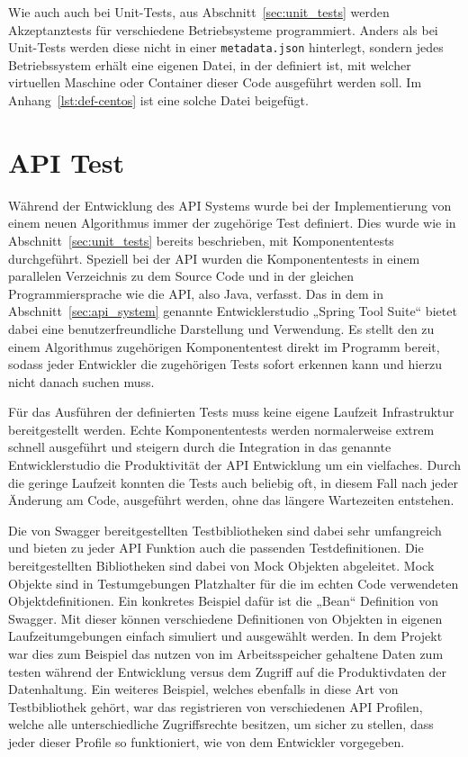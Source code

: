 {Wie auch auch bei Unit\hyp{}Tests, aus Abschnitt~\ref{sec:unit_tests} werden
Akzeptanztests für verschiedene Betriebsysteme programmiert. Anders als bei
Unit\hyp{}Tests werden diese nicht in einer \texttt{metadata.json} hinterlegt,
sondern jedes Betriebssystem erhält eine eigenen Datei, in der definiert ist,
mit welcher virtuellen Maschine oder Container dieser Code ausgeführt werden
soll. Im Anhang~\ref{lst:def-centos} ist eine solche Datei beigefügt.
\mr%

\section{API Test}
\label{sec:api_test}
Während der Entwicklung des API Systems wurde bei der Implementierung von einem
neuen Algorithmus immer der zugehörige Test definiert. Dies wurde wie in
Abschnitt~\ref{sec:unit_tests} bereits beschrieben, mit Komponententests
durchgeführt. Speziell bei der API wurden die Komponententests in einem
parallelen Verzeichnis zu dem Source Code und in der gleichen
Programmiersprache wie die API, also Java, verfasst. Das in dem in
Abschnitt~\ref{sec:api_system} genannte Entwicklerstudio „Spring Tool Suite“
bietet dabei eine benutzerfreundliche Darstellung und Verwendung. Es stellt den
zu einem Algorithmus zugehörigen Komponententest direkt im Programm bereit,
sodass jeder Entwickler die zugehörigen Tests sofort erkennen kann und hierzu
nicht danach suchen muss.

Für das Ausführen der definierten Tests muss keine eigene Laufzeit
Infrastruktur bereitgestellt werden. Echte Komponententests werden
normalerweise extrem schnell ausgeführt und steigern durch die Integration in
das genannte Entwicklerstudio die Produktivität der API Entwicklung um ein
vielfaches. Durch die geringe Laufzeit konnten die Tests auch beliebig oft, in
diesem Fall nach jeder Änderung am Code, ausgeführt werden, ohne das längere
Wartezeiten entstehen.

Die von Swagger bereitgestellten Testbibliotheken sind dabei sehr umfangreich
und bieten zu jeder API Funktion auch die passenden Testdefinitionen. Die
bereitgestellten Bibliotheken sind dabei von Mock Objekten abgeleitet. Mock
Objekte sind in Testumgebungen Platzhalter für die im echten Code verwendeten
Objektdefinitionen. Ein konkretes Beispiel dafür ist die „Bean“ Definition von
Swagger. Mit dieser können verschiedene Definitionen von Objekten in eigenen
Laufzeitumgebungen einfach simuliert und ausgewählt werden. In dem Projekt war
dies zum Beispiel das nutzen von im Arbeitsspeicher gehaltene Daten zum testen
während der Entwicklung versus dem Zugriff auf die Produktivdaten der
Datenhaltung. Ein weiteres Beispiel, welches ebenfalls in diese Art von
Testbibliothek gehört, war das registrieren von verschiedenen API Profilen,
welche alle unterschiedliche Zugriffsrechte besitzen, um sicher zu stellen,
dass jeder dieser Profile so funktioniert, wie von dem Entwickler vorgegeben.

}
